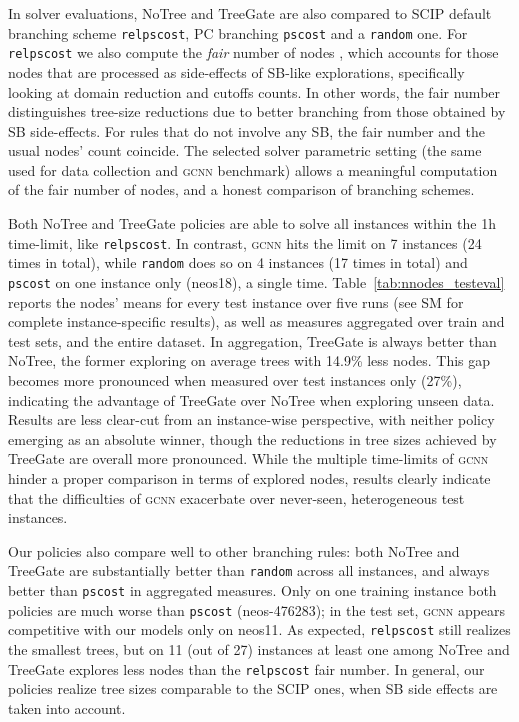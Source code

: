 \documentclass[letterpaper]{article} %
\begin{document}
In solver evaluations, NoTree and TreeGate are also compared to SCIP default branching scheme \texttt{relpscost}, PC branching \texttt{pscost} and a \texttt{random} one.
For \texttt{relpscost} we also compute the \emph{fair} number of nodes \cite{gamrath_impact}, which accounts for those nodes that are processed as side-effects of SB-like explorations, specifically looking at domain reduction and cutoffs counts.
In other words, the fair number distinguishes tree-size reductions due to better branching from those obtained by SB side-effects.
For rules that do not involve any SB, the fair number and the usual nodes' count coincide.
The selected solver parametric setting (the same used for data collection and \textsc{gcnn} benchmark) allows a meaningful computation of the fair number of nodes, and a honest comparison of branching schemes.

Both NoTree and TreeGate policies are able to solve all instances within the 1h time-limit, like \texttt{relpscost}.
In contrast, \textsc{gcnn} hits the limit on 7 instances (24 times in total), while \texttt{random} does so on 4 instances (17 times in total) and \texttt{pscost} on one instance only (neos18), a single time.
Table~\ref{tab:nnodes_testeval} reports the nodes' means for every test instance over five runs (see SM for complete instance-specific results), as well as measures aggregated over train and test sets, and the entire dataset.
In aggregation, TreeGate is always better than NoTree, the former exploring on average trees with 14.9\% less nodes.
This gap becomes more pronounced when measured over test instances only (27\%), indicating the advantage of TreeGate over NoTree when exploring unseen data.
Results are less clear-cut from an instance-wise perspective, with neither policy emerging as an absolute winner, though the reductions in tree sizes achieved by TreeGate are overall more pronounced.
While the multiple time-limits of \textsc{gcnn} hinder a proper comparison in terms of explored nodes, results clearly indicate that the difficulties of \textsc{gcnn} exacerbate over never-seen, heterogeneous test instances.

Our policies also compare well to other branching rules: both NoTree and TreeGate are substantially better than \texttt{random} across all instances, and always better than \texttt{pscost} in aggregated measures.
Only on one training instance both policies are much worse than \texttt{pscost} (neos-476283); in the test set, \textsc{gcnn} appears competitive with our models only on neos11.
As expected, \texttt{relpscost} still realizes the smallest trees, but on 11 (out of 27) instances at least one among NoTree and TreeGate explores less nodes than the \texttt{relpscost} fair number.
In general, our policies realize tree sizes comparable to the SCIP ones, when SB side effects are taken into account.
\end{document}
